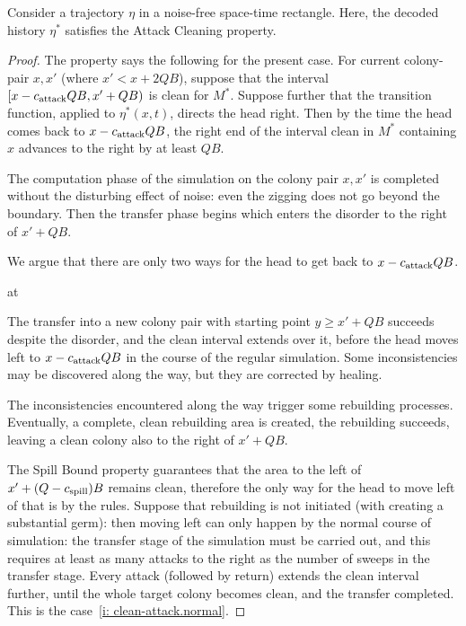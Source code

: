 \documentclass[11pt]{memoir}
\theoremstyle{definition} %
\renewcommand{\ge}{\geq}
\def\B{B}
\newcommand{\Q}{Q}
\newcommand{\cns}[1]{c_{\textrm{\upshape #1}}}
\newcommand{\CAtt}{\cns{attack}}
\newcommand{\CSpill}{\cns{spill}}
\begin{document}
\begin{lemma}\label{lem:clean-attack}
Consider a trajectory \( \eta \) in a noise-free space-time rectangle.
Here, the decoded history \( \eta^{*} \) satisfies the Attack Cleaning property.
\end{lemma}
\begin{proof}
The property says the following for the present case.
For current colony-pair \( x,x' \) (where \( x'< x+2\Q\B \)), suppose that the interval
\( \lint{x-\CAtt\Q\B}{x'+\Q\B} \) is clean for \( M^{*} \).
Suppose further that the transition function, applied to \( \eta^{*}(x,t) \), directs the head right.
Then by the time the head comes back to \( x-\CAtt\Q\B \),
the right end of the interval clean in \( M^{*} \)
containing \( x \) advances to the right by at least \( \Q\B \).

The computation phase of the simulation on the colony pair 
\( x, x' \) is completed without the disturbing effect
of noise: even the zigging does not go beyond the boundary.
Then the transfer phase begins which enters the disorder to the right of \( x'+\Q\B \).

We argue that there are only two ways for the head to get back to \( x-\CAtt\Q\B \).
\begin{varenum}{at}
\item\label{i: clean-attack.normal} The transfer into a new colony pair with starting point
\( y\ge x'+\Q\B \) succeeds despite the disorder, and the clean interval extends over it, before
the head moves left to \( x-\CAtt\Q\B \) in the course of the regular simulation.
Some inconsistencies may be discovered along the way, but they are corrected by healing.

\item\label{i: clean-attack.rebuild} The inconsistencies encountered along the way trigger some
rebuilding processes.
Eventually, a complete, clean rebuilding area is created, the rebuilding succeeds, leaving a clean
colony also to the right of \( x'+\Q\B \).
\end{varenum}

The Spill Bound property guarantees that the area to the left
of \( x'+(\Q-\CSpill)\B \) remains clean,
therefore the only way for the head to move left of that is by the rules.
Suppose that rebuilding is not initiated (with creating a substantial germ):
then moving left can only happen by the normal
course of simulation: the transfer stage of the simulation must be carried out, and this requires 
at least as many attacks to the right as the number of sweeps in the transfer stage.
Every attack (followed by return) extends the clean interval further, until the whole target colony becomes clean,
and the transfer completed.
This is the case~\eqref{i: clean-attack.normal}.


\end{proof}
\end{document}
